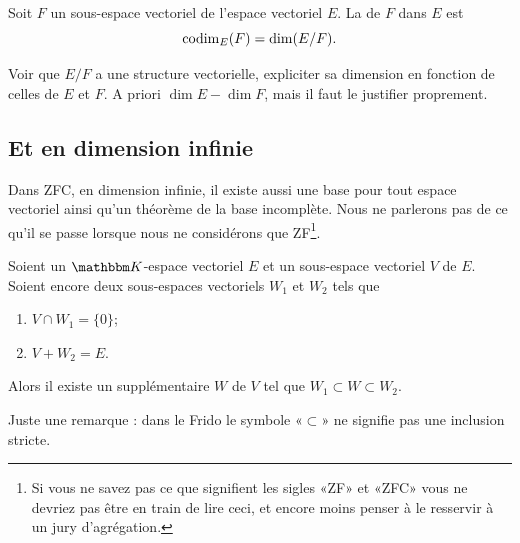 \begin{definition}\label{DefCodimension}
Soit \( F\) un sous-espace vectoriel de l'espace vectoriel \( E\). La  de \( F\) dans \( E\) est
\begin{equation}
    \operatorname{codim}_E(F)=\dim(E/F).
\end{equation}
\end{definition}

\begin{probleme}
Voir que $E/F$ a une structure vectorielle, expliciter sa dimension en fonction de celles de $E$ et $F$. A priori \( \dim E - \dim F \), mais il faut le justifier proprement.
\end{probleme}
\subsection{Et en dimension infinie}

Dans ZFC, en dimension infinie, il existe aussi une base pour tout espace vectoriel ainsi qu'un théorème de la base incomplète. Nous ne parlerons pas de ce qu'il se passe lorsque nous ne considérons que ZF\footnote{Si vous ne savez pas ce que signifient les sigles «ZF» et «ZFC» vous ne devriez pas être en train de lire ceci, et encore moins penser à le resservir à un jury d'agrégation.}.

\begin{lemma}        \label{LEMooSSRXooIyfgNz}
    Soient un \( \eK\)-espace vectoriel \( E\) et un sous-espace vectoriel \( V\) de \( E\). Soient encore deux sous-espaces vectoriels \( W_1\) et \( W_2\) tels que
    \begin{enumerate}
        \item
            \( V\cap W_1=\{ 0 \}\);
        \item
            \( V+W_2=E\).
    \end{enumerate}
    Alors il existe un supplémentaire \( W\) de \( V\) tel que \( W_1\subset W\subset W_2\).
\end{lemma}

Juste une remarque : dans le Frido le symbole «\( \subset\)» ne signifie pas une inclusion stricte.

